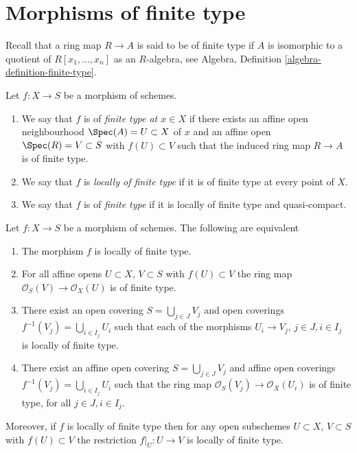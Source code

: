 \section{Morphisms of finite type}
\label{section-finite-type}

\noindent
Recall that a ring map $R \to A$ is said to be of finite type if
$A$ is isomorphic to a quotient of $R[x_1, \ldots, x_n]$ as an $R$-algebra, see
Algebra, Definition \ref{algebra-definition-finite-type}.

\begin{definition}
\label{definition-finite-type}
Let $f : X \to S$ be a morphism of schemes.
\begin{enumerate}
\item We say that $f$ is of {\it finite type at $x \in X$} if
there exists an affine open neighbourhood $\Spec(A) = U \subset X$
of $x$ and an affine open $\Spec(R) = V \subset S$
with $f(U) \subset V$ such that the induced ring map
$R \to A$ is of finite type.
\item We say that $f$ is {\it locally of finite type} if it is
of finite type at every point of $X$.
\item We say that $f$ is of {\it finite type} if it is locally of
finite type and quasi-compact.
\end{enumerate}
\end{definition}

\begin{lemma}
\label{lemma-locally-finite-type-characterize}
Let $f : X \to S$ be a morphism of schemes.
The following are equivalent
\begin{enumerate}
\item The morphism $f$ is locally of finite type.
\item For all affine opens $U \subset X$, $V \subset S$
with $f(U) \subset V$ the ring map
$\mathcal{O}_S(V) \to \mathcal{O}_X(U)$ is of finite type.
\item There exist an open covering $S = \bigcup_{j \in J} V_j$
and open coverings $f^{-1}(V_j) = \bigcup_{i \in I_j} U_i$ such
that each of the morphisms $U_i \to V_j$, $j\in J, i\in I_j$
is locally of finite type.
\item There exist an affine open covering $S = \bigcup_{j \in J} V_j$
and affine open coverings $f^{-1}(V_j) = \bigcup_{i \in I_j} U_i$ such
that the ring map $\mathcal{O}_S(V_j) \to \mathcal{O}_X(U_i)$ is
of finite type, for all $j\in J, i\in I_j$.
\end{enumerate}
Moreover, if $f$ is locally of finite type then for
any open subschemes $U \subset X$, $V \subset S$ with $f(U) \subset V$
the restriction $f|_U : U \to V$ is locally of finite type.
\end{lemma}

